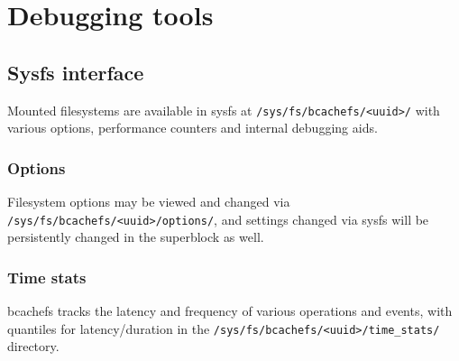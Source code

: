 \documentclass{article}
\begin{document}
\section{Debugging tools}

\subsection{Sysfs interface}

Mounted filesystems are available in sysfs at \texttt{/sys/fs/bcachefs/<uuid>/}
with various options, performance counters and internal debugging aids.

\subsubsection{Options}

Filesystem options may be viewed and changed via \\
\texttt{/sys/fs/bcachefs/<uuid>/options/}, and settings changed via sysfs will
be persistently changed in the superblock as well.

\subsubsection{Time stats}

bcachefs tracks the latency and frequency of various operations and events, with
quantiles for latency/duration in the
\texttt{/sys/fs/bcachefs/<uuid>/time\_stats/} directory.
\end{document}
